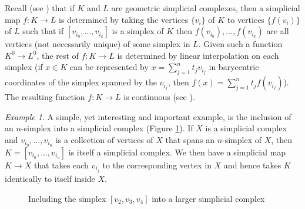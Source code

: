 \documentclass[12pt]{article}
\theoremstyle{plain}
\theoremstyle{definition}
\theoremstyle{remark}
\newtheorem{example}[theorem]{Example}
\begin{document}
Recall (see \cite[Section 2]{MK}) that if $K$ and $L$ are geometric simplicial complexes, then a simplicial map $f\colon K\to L$ is determined by taking the vertices $\{v_i\}$ of $K$ to vertices $\{f(v_i)\}$ of $L$ such that if $[v_{i_0},\ldots, v_{i_k}]$ is a simplex of $K$ then $f(v_{i_0}),\ldots, f(v_{i_k})$ are all vertices (not necessarily unique) of some simplex in $L$. Given such a function $K^0\to L^0$, the rest of $f\colon K\to L$ is determined by linear interpolation on each simplex (if $x\in K$ can be represented by $x=\sum_{j=1}^n t_jv_{i_j}$ in barycentric coordinates of the simplex spanned by the $v_{i_j}$, then $f(x)=\sum_{j=1}^n t_jf(v_{i_j})$).  The resulting function $f\colon K\to L$ is continuous (see \cite{MK}). 

\begin{example}
A simple, yet interesting and important example, is the inclusion of an $n$-simplex into a simplicial complex (Figure \ref{F: fig5-0}). If $X$ is a simplicial complex and ${v_{i_0},\ldots, v_{i_n}}$ is a collection of vertices of $X$ that spans an $n$-simplex of $X$, then $K=[v_{i_0},\ldots, v_{i_n}]$ is itself a simplicial complex. We then have a simplicial map $K\to X$ that takes each $v_{i_j}$ to the corresponding vertex in $X$ and hence takes $K$ identically to itself inside $X$. 


\begin{figure}[!htp]
\begin{center}
\end{center}
\caption{Including the simplex $[v_2,v_3,v_4]$ into a larger simplicial complex}\label{F: fig5-0}
\end{figure}
\end{example}
\end{document}
